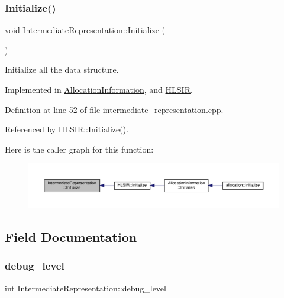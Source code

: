 \subsubsection{\texorpdfstring{Initialize()}{Initialize()}}
{\footnotesize\ttfamily void Intermediate\+Representation\+::\+Initialize (\begin{DoxyParamCaption}{ }\end{DoxyParamCaption})\hspace{0.3cm}{\ttfamily [pure virtual]}}



Initialize all the data structure. 



Implemented in \hyperlink{classAllocationInformation_ad1263fb5b76f2dd97daacfcf3012f3e4}{Allocation\+Information}, and \hyperlink{classHLSIR_a37c3471e94bbb635d9fac51cca161225}{H\+L\+S\+IR}.



Definition at line 52 of file intermediate\+\_\+representation.\+cpp.



Referenced by H\+L\+S\+I\+R\+::\+Initialize().

Here is the caller graph for this function\+:
\nopagebreak
\begin{figure}[H]
\begin{center}
\leavevmode
\includegraphics[width=350pt]{d7/dfa/classIntermediateRepresentation_ae09602bb8001b048690ce2a48347db36_icgraph}
\end{center}
\end{figure}


\subsection{Field Documentation}
\mbox{\label{classIntermediateRepresentation_ad6cabd42e1299ae26982886beba17aad}} 
\subsubsection{\texorpdfstring{debug\+\_\+level}{debug\_level}}
{\footnotesize\ttfamily int Intermediate\+Representation\+::debug\+\_\+level\hspace{0.3cm}{\ttfamily [protected]}}



